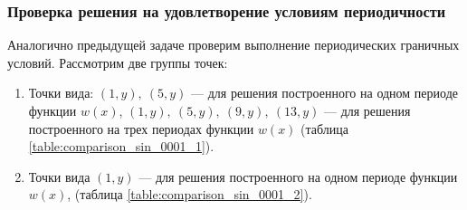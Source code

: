\documentclass[12pt, a4paper]{article}
\begin{document}
		\subsubsection{Проверка решения на удовлетворение условиям периодичности}
			Аналогично предыдущей задаче проверим выполнение периодических граничных условий. Рассмотрим две группы точек:
			\begin{enumerate}
				
				\item Точки вида: $(1, y),\ (5, y)$ --- для решения построенного на одном периоде функции $w(x)$,
				$(1, y),\ (5, y),\ (9, y),\ (13, y)$ --- для решения построенного на трех периодах функции $w(x)$ (таблица \ref{table:comparison_sin_0001_1}).
				
				\item Точки вида $(1, y)$ --- для решения построенного на одном периоде функции $w(x)$,
				 (таблица \ref{table:comparison_sin_0001_2}).
				
			\end{enumerate}
			
			\newpage
			
\end{document}
